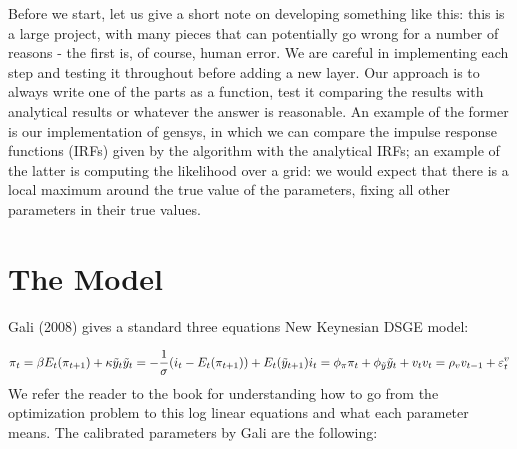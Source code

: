 \documentclass[12pt,a4paper]{article}
\begin{document}
Before we start, let us give a short note on developing something like this: this is a large project, with many pieces that can potentially go wrong for a number of reasons - the first is, of course, human error. We are careful in implementing each step and testing it throughout before adding a new layer. Our approach is to always write one of the parts as a function, test it comparing the results with analytical results or whatever the answer is reasonable. An example of the former is our implementation of gensys, in which we can compare the impulse response functions (IRFs) given by the algorithm with the analytical IRFs; an example of the latter is computing the likelihood over a grid: we would expect that there is a local maximum around the true value of the parameters, fixing all other parameters in their true values.

\section{The Model}
Gali (2008) gives a standard three equations New Keynesian DSGE model:

\[
\pi_t = \beta E_t(\pi_{t+1}) + \kappa \tilde{y}_t\\
\tilde{y}_t = -\frac{1}{\sigma} (i_t - E_t(\pi_{t+1})) + E_t(\tilde{y}_{t+1})\\
i_t = \phi_{\pi} \pi_t + \phi_{\tilde{y}} \tilde{y}_t + v_t\\
v_t = \rho_v v_{t-1} + \varepsilon_t^v
\]
We refer the reader to the book for understanding how to go from the optimization problem to this log linear equations and what each parameter means. The calibrated parameters by Gali are the following:
\end{document}
